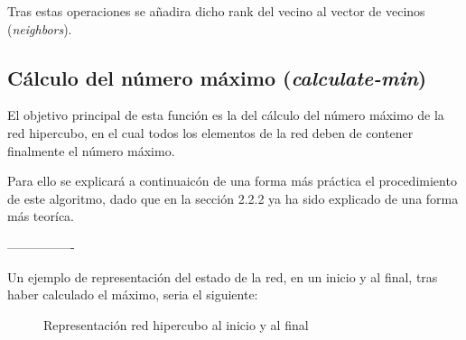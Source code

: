 \documentclass[11pt]{article}
\newif\ifspanish %
\begin{document}
Tras estas operaciones se añadira dicho rank del vecino al vector de vecinos (\textit{neighbors}).

\subsection{Cálculo del número máximo (\textit{calculate-min})}
El objetivo principal de esta función es la del cálculo del número máximo de la red hipercubo, en el cual todos los elementos de la red deben de contener finalmente el número máximo.

Para ello se explicará a continuaicón de una forma más práctica el procedimiento de este algoritmo, dado que en la sección 2.2.2 ya ha sido explicado de una forma más teoríca.

----------------




Un ejemplo de representación del estado de la red, en un inicio y al final, tras haber calculado el máximo, seria el siguiente:

\begin{figure}[H]
  \centering
  \caption{Representación red hipercubo al inicio y al final}
  \label{fig:toroide}
\end{figure}

\clearpage

 

\newpage



\ifspanish
	\addcontentsline{toc}{section}{Referencias}
\else
\fi
\end{document}
